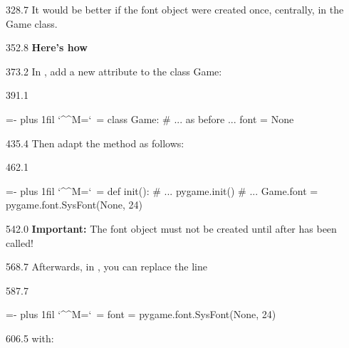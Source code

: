 \documentclass{aslab}
\makeatletter
\newcommand*\kw[1]{\textcolor{codeorange}{#1}}
\newcommand*\fn[1]{\textcolor{codecyan}{#1}}
\newcommand*\num[1]{\textcolor{codered}{#1}}
\newcommand*\cmt[1]{\textcolor{codepurple}{#1}}
\newenvironment{pycode}{\par\ttfamily\hyphenchar\font=-1
  \lineskiplimit=-\maxdimen\lineskip=0pt\parindent=0pt
  \parfillskip=0pt plus 1fil\relax
  \catcode`\^^M=\active\catcode`\ =\active\py@setup\py@gobble}{}
\newcommand*\emo[1]{\makebox[18bp][l]{\emoji{#1}}}
\makeatother
\begin{document}
\begin{region}[x=74.7,right=0]{328.7}
It would be better if the font object were created once, centrally, in the
Game class.
\end{region}

\begin{region}[x=74.7]{352.8}
\emo{1F527}\textbf{Here's how}
\end{region}

\begin{region}[x=74.7]{373.2}
In , add a new attribute to the class Game:
\end{region}

\begin{region}[x=74.7,pitch=13.2]{391.1}
\begin{pycode}
\kw{class} \fn{Game}:
    \cmt{\# ... as before ...}
    font = \fn{None}
\end{pycode}
\end{region}

\begin{region}[x=74.7]{435.4}
Then adapt the  method as follows:
\end{region}

\begin{region}[x=74.7,pitch=13.2]{462.1}
\begin{pycode}
    \kw{def} \fn{init}():
        \cmt{\# ...}
        pygame.init()
        \cmt{\# ...}
        Game.font = pygame.font.SysFont(\fn{None}, \num{24})
\end{pycode}
\end{region}

\begin{region}[x=74.7,right=0]{542.0}
\textbf{Important:} The font object must not be created until after
 has been called!
\end{region}

\begin{region}[x=74.7]{568.7}
Afterwards, in , you can replace the line
\end{region}

\begin{region}[x=90.0]{587.7}
\begin{pycode}
font = pygame.font.SysFont(\fn{None}, \num{24})
\end{pycode}
\end{region}

\begin{region}[x=74.7]{606.5}
with:
\end{region}
\end{document}
